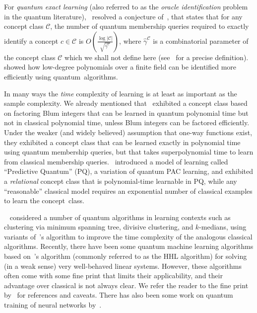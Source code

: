 \documentclass[twoside,11pt]{article}
\newcommand{\C}{\ensuremath{\mathscr{C}}}
\begin{document}
For \emph{quantum exact learning} (also referred to as the \emph{oracle identification} problem in the quantum literature),~\cite{kothari:oracleidentification} resolved a conjecture of~\cite{hunziker:quantumexactlearning}, that states that for any concept class $\C$, the number of quantum membership queries required  to exactly identify a concept $c\in \C$ is $O(\frac{\log |\C|}{\sqrt{\hat{\gamma}^\C}})$, where $\hat{\gamma}^\C$ is a combinatorial parameter of the concept class $\C$ which we shall not define here (see~\cite{atici&servedio:qlearning} for a precise definition).~\cite{montanaro:learningpolynomials} showed how low-degree polynomials over a finite field can be identified more efficiently using quantum~algorithms. 

In many ways the \emph{time} complexity of learning is at least as important as the sample complexity. We already mentioned that~\cite{servedio&gortler:equivalencequantumclassical} exhibited a concept class based on factoring Blum integers that can be learned in quantum polynomial time but not in classical polynomial time, unless Blum integers can be factored efficiently.
Under the weaker (and widely believed) assumption that one-way functions exist, they exhibited a concept class that can be learned exactly in polynomial time using quantum membership queries, but that takes superpolynomial time to learn from classical membership queries.~\cite{gavinsky:predictivelearning} introduced a model of learning called ``Predictive Quantum'' (PQ), a variation of quantum PAC learning, and exhibited a \emph{relational} concept class that is polynomial-time learnable in PQ, while any ``reasonable'' classical model requires an exponential number of classical examples to learn the concept~class.

~\cite{aimeur:mlinquantumworld,aimeur:qspeedup} considered a number of quantum algorithms in learning contexts such as clustering via minimum spanning tree, divisive clustering, and $k$-medians, using variants of~\cite{grover:search}'s algorithm to improve the time complexity of the analogous classical algorithms. Recently, there have been some quantum machine learning algorithms based on~\cite{hhl:lineq}'s algorithm (commonly referred to as the HHL algorithm) for solving (in a weak sense) very well-behaved linear systems.  However, these algorithms often come with some fine print that limits their applicability, and their advantage over classical is not always clear.  We refer the reader to the fine print by~\cite{aaronson:fineprint} for references and caveats. There has also been some work on quantum training of neural networks by~\cite{wiebe:quantumdeeplearning,wiebe:quantumperceptronmodels}.
\end{document}
